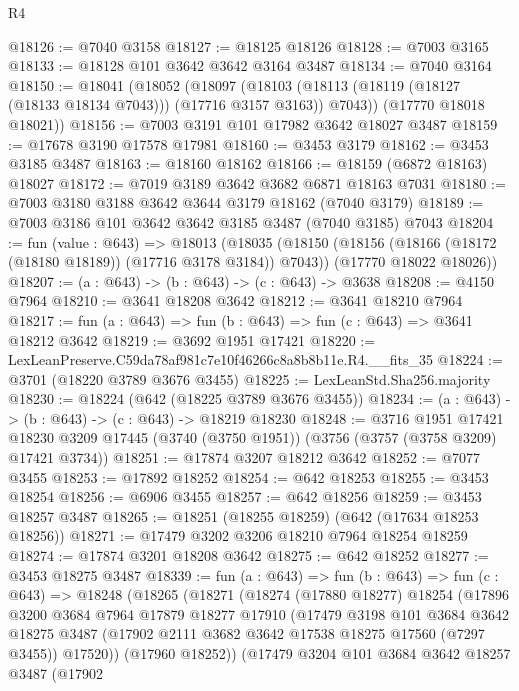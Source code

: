 \begin{lexlean}{R4}
\begin{coremodule}
@18126 := @7040 @3158
@18127 := @18125 @18126
@18128 := @7003 @3165
@18133 := @18128 @101 @3642 @3642 @3164 @3487
@18134 := @7040 @3164
@18150 := @18041
    (@18052
      (@18097 (@18103 (@18113 (@18119 (@18127 (@18133 @18134 @7043))) (@17716 @3157 @3163)) @7043))
      (@17770 @18018 @18021))
@18156 := @7003 @3191 @101 @17982 @3642 @18027 @3487
@18159 := @17678 @3190 @17578 @17981
@18160 := @3453 @3179
@18162 := @3453 @3185 @3487
@18163 := @18160 @18162
@18166 := @18159 (@6872 @18163) @18027
@18172 := @7019 @3189 @3642 @3682 @6871 @18163 @7031
@18180 := @7003 @3180 @3188 @3642 @3644 @3179 @18162 (@7040 @3179)
@18189 := @7003 @3186 @101 @3642 @3642 @3185 @3487 (@7040 @3185) @7043
@18204 := fun (value : @643) =>
  @18013
    (@18035
      (@18150 (@18156 (@18166 (@18172 (@18180 @18189)) (@17716 @3178 @3184)) @7043))
      (@17770 @18022 @18026))
@18207 := (a : @643) -> (b : @643) -> (c : @643) -> @3638
@18208 := @4150 @7964
@18210 := @3641 @18208 @3642
@18212 := @3641 @18210 @7964
@18217 := fun (a : @643) => fun (b : @643) => fun (c : @643) => @3641 @18212 @3642
@18219 := @3692 @1951 @17421
@18220 := LexLeanPreserve.C59da78af981c7e10f46266c8a8b8b11e.R4.__fits_35
@18224 := @3701 (@18220 @3789 @3676 @3455)
@18225 := LexLeanStd.Sha256.majority
@18230 := @18224 (@642 (@18225 @3789 @3676 @3455))
@18234 := (a : @643) -> (b : @643) -> (c : @643) -> @18219 @18230
@18248 := @3716
    @1951
    @17421
    @18230
    @3209
    @17445
    (@3740 (@3750 @1951))
    (@3756 (@3757 (@3758 @3209) @17421 @3734))
@18251 := @17874 @3207 @18212 @3642
@18252 := @7077 @3455
@18253 := @17892 @18252
@18254 := @642 @18253
@18255 := @3453 @18254
@18256 := @6906 @3455
@18257 := @642 @18256
@18259 := @3453 @18257 @3487
@18265 := @18251 (@18255 @18259) (@642 (@17634 @18253 @18256))
@18271 := @17479 @3202 @3206 @18210 @7964 @18254 @18259
@18274 := @17874 @3201 @18208 @3642
@18275 := @642 @18252
@18277 := @3453 @18275 @3487
@18339 := fun (a : @643) =>
  fun (b : @643) =>
  fun (c : @643) =>
  @18248
    (@18265
      (@18271
        (@18274
          (@17880 @18277)
          @18254
          (@17896
            @3200
            @3684
            @7964
            @17879
            @18277
            @17910
            (@17479
              @3198
              @101
              @3684
              @3642
              @18275
              @3487
              (@17902 @2111 @3682 @3642 @17538 @18275 @17560 (@7297 @3455))
              @17520))
          (@17960 @18252))
        (@17479
          @3204
          @101
          @3684
          @3642
          @18257
          @3487
          (@17902

\end{coremodule}
\end{lexlean}
